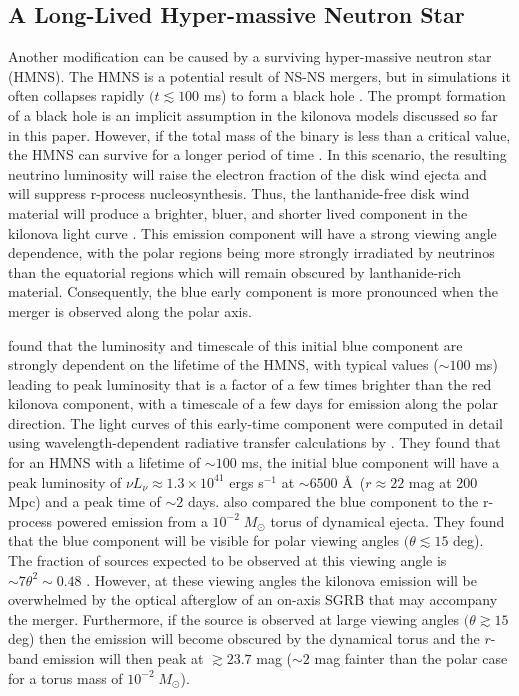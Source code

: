 \subsection{A Long-Lived Hyper-massive Neutron Star}
\label{sec:HMNS}
Another modification can be caused by a  surviving hyper-massive neutron star (HMNS). The HMNS is a potential result of NS-NS mergers, but in simulations it often collapses rapidly $(t \lesssim 100$ ms) to form a black hole \citep{Sekiguchi+11}. The prompt formation of a black hole is an implicit assumption in the kilonova models discussed so far in this paper. However, if the total mass of the binary is less than a critical value, the HMNS can survive for a longer period of time \citep{Bauswein+13a,Kaplan+13}. In this scenario, the resulting neutrino luminosity will raise the electron fraction of the disk wind ejecta and will suppress r-process nucleosynthesis. Thus, the lanthanide-free disk wind material will produce a brighter, bluer, and shorter lived component in the kilonova light curve \citep[see e.g.,][and references therein]{MetzgerPiro14,MetzgerFernandez14}. This emission component will have a strong viewing angle dependence, with the polar regions being more strongly irradiated by neutrinos than the equatorial regions which will remain obscured by lanthanide-rich material. Consequently, the blue early component is more pronounced when the merger is observed along the polar axis. 

\citet{MetzgerFernandez14} found that the luminosity and timescale of this initial blue component are strongly dependent on the lifetime of the HMNS, with typical values ($\sim 100$ ms) leading to peak luminosity that is a factor of a few times brighter than the red kilonova component, with a timescale of a few days for emission along the polar direction. The light curves of this early-time component were computed in detail using wavelength-dependent radiative transfer calculations by \citet{Kasen+15}. They found that for an HMNS with a lifetime of $\sim100$ ms, the initial blue component will have a peak luminosity of $\nu L_{\nu} \approx 1.3\times10^{41}$ ergs s$^{-1}$ at $\sim6500$ \AA\,  ($r \approx 22$ mag at 200 Mpc) and a peak time of $\sim2$ days. \citet{Kasen+15} also compared the blue component to the r-process powered emission from a $10^{-2}\;M_{\odot}$ torus of dynamical ejecta. They found that the blue component will be visible for polar viewing angles $(\theta \lesssim 15$ deg). The fraction of sources expected to be observed at this viewing angle is $\sim7\theta^2\sim0.48$ \citep{MetzgerBerger12}. However, at these viewing angles the kilonova emission will be overwhelmed by the optical afterglow of an on-axis SGRB that may accompany the merger. Furthermore, if the source is observed at large viewing angles $(\theta \gtrsim 15$ deg) then the emission will become obscured by the dynamical torus and the $r$-band emission will then peak at $\gtrsim 23.7$ mag ($\sim2$ mag fainter than the polar case for a torus mass of $10^{-2}\;M_{\odot}$).
   
